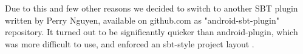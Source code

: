 Due to this and few other reasons we decided to switch to another SBT plugin written by Perry Nguyen, available on github.com as "android-sbt-plugin" repository. It turned out to be significantly quicker than android-plugin, which was more difficult to use, and enforced an sbt-style project layout \cite{Nguyen:2013:differences}.





